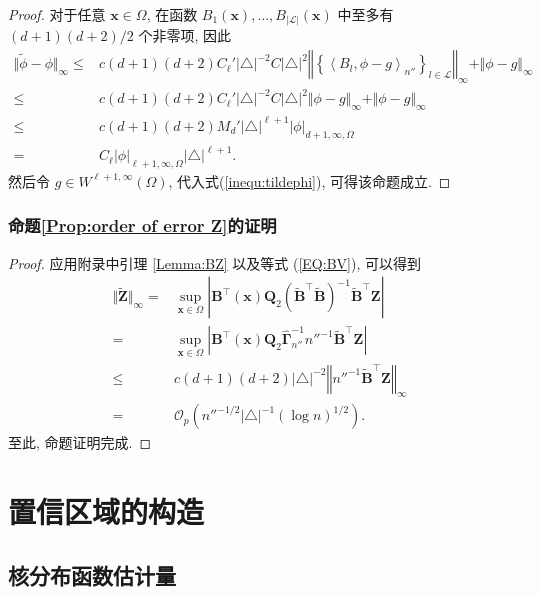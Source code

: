 \documentclass[a4paper,openay,14pt]{ctexbook}
\numberwithin{equation}{section}
\numberwithin{lem}{section}
\newcommand{\chapterwithfancyheader}[1]{  
    \chapter{#1} %
    \thispagestyle{fancy} %
}
\begin{document}
\begin{proof}
对于任意 $\boldsymbol{x} \in \Omega$, 在函数 $B_1(\boldsymbol{x}), \dots, B_{\vert \mathcal{L} \vert}(\boldsymbol{x})$ 中至多有 $(d+1)(d+2)/2$ 个非零项, 因此
\begin{align*}
    \Vert \tilde{\phi} - \phi\Vert_{\infty}
    \leq& c(d+1)(d+2)C_\ell'\vert\triangle\vert^{-2}C\vert\triangle\vert^{2} \left\Vert\left\{\left\langle B_l,\phi-g\right\rangle_{n''}\right\}_{l\in\mathcal{L}}\right\Vert_{\infty}+ \Vert\phi-g\Vert_{\infty}\\
    \leq& c(d+1)(d+2)C_\ell'\vert\triangle\vert^{-2}C\vert\triangle\vert^{2}\Vert \phi-g\Vert_{\infty} + \Vert\phi-g\Vert_{\infty}\\
    \leq& c(d+1)(d+2)M_d'\vert\triangle\vert^{\ell+1}\vert \phi\vert_{d+1,\infty,\Omega}\\
    =& C_\ell \vert\phi\vert_{\ell+1,\infty,\Omega}\vert \triangle\vert^{\ell+1}.
\end{align*}
然后令 $g \in W^{\ell+1,\infty}(\Omega)$, 代入式(\ref{inequ:tildephi}), 可得该命题成立.
\end{proof}

\subsection{命题\ref{Prop:order of error Z}的证明}
\begin{proof}
    应用附录中引理 \ref{Lemma:BZ} 以及等式 (\ref{EQ:BV}), 可以得到
\begin{align*}
    \Vert \tilde{\boldsymbol{Z}}\Vert_{\infty} = &\sup_{\boldsymbol{x}\in\Omega}\left\vert\boldsymbol{B}^{\top}(\boldsymbol{x})\boldsymbol{Q}_2\left(\tilde{\boldsymbol{B}}^{\top}\tilde{\boldsymbol{B}}\right)^{-1}\tilde{\boldsymbol{B}}^{\top}\boldsymbol{Z}\right\vert\\
    =&\sup_{\boldsymbol{x}\in\Omega}\left\vert{\boldsymbol{B}}^{\top}(\boldsymbol{x})\boldsymbol{Q}_2\hat{\bm{\Gamma}}^{-1}_{n''}{n''^{-1}\tilde{\boldsymbol{B}}}^{\top}\boldsymbol{Z}\right\vert\\
    \leq & c(d+1)(d+2)\vert\triangle\vert^{-2}\left\Vert n''^{-1}\tilde{\boldsymbol{B}}^{\top}\boldsymbol{Z}\right\Vert_{\infty}\\
    =& \mathcal{O}_p\left(n''^{-1/2}\vert\triangle\vert^{-1}(\log n)^{1/2}\right).
\end{align*}
至此, 命题证明完成.
\end{proof}

\chapterwithfancyheader{置信区域的构造}\label{SEC: estimate}

\section{核分布函数估计量}\label{KDE}
\end{document}
